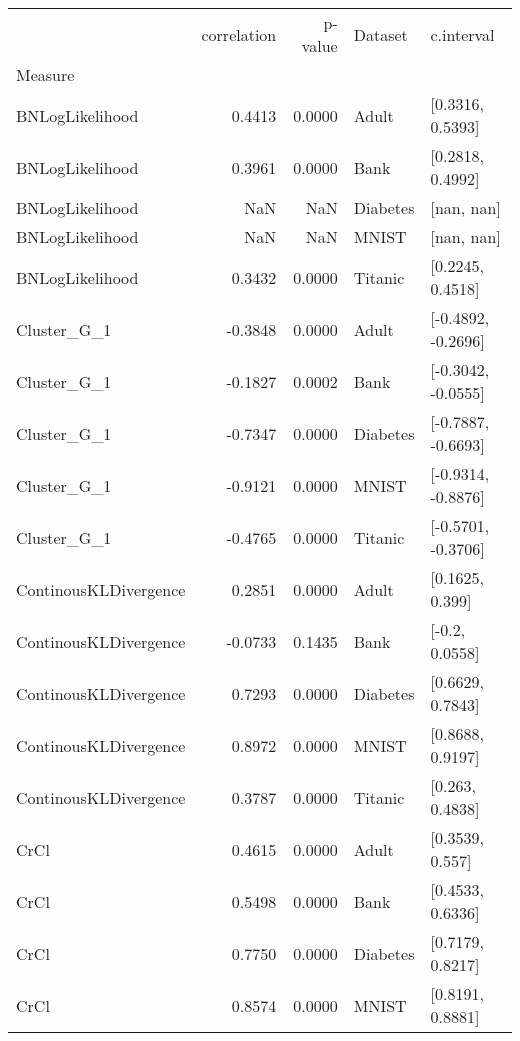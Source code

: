 \begin{tabular}{lrrll}
\toprule
{} &  correlation &  p-value &   Dataset &          c.interval \\
Measure               &              &          &           &                     \\
\midrule
BNLogLikelihood       &       0.4413 &   0.0000 &     Adult &    [0.3316, 0.5393] \\
BNLogLikelihood       &       0.3961 &   0.0000 &      Bank &    [0.2818, 0.4992] \\
BNLogLikelihood       &          NaN &      NaN &  Diabetes &          [nan, nan] \\
BNLogLikelihood       &          NaN &      NaN &     MNIST &          [nan, nan] \\
BNLogLikelihood       &       0.3432 &   0.0000 &   Titanic &    [0.2245, 0.4518] \\
Cluster\_G\_1           &      -0.3848 &   0.0000 &     Adult &  [-0.4892, -0.2696] \\
Cluster\_G\_1           &      -0.1827 &   0.0002 &      Bank &  [-0.3042, -0.0555] \\
Cluster\_G\_1           &      -0.7347 &   0.0000 &  Diabetes &  [-0.7887, -0.6693] \\
Cluster\_G\_1           &      -0.9121 &   0.0000 &     MNIST &  [-0.9314, -0.8876] \\
Cluster\_G\_1           &      -0.4765 &   0.0000 &   Titanic &  [-0.5701, -0.3706] \\
ContinousKLDivergence &       0.2851 &   0.0000 &     Adult &     [0.1625, 0.399] \\
ContinousKLDivergence &      -0.0733 &   0.1435 &      Bank &      [-0.2, 0.0558] \\
ContinousKLDivergence &       0.7293 &   0.0000 &  Diabetes &    [0.6629, 0.7843] \\
ContinousKLDivergence &       0.8972 &   0.0000 &     MNIST &    [0.8688, 0.9197] \\
ContinousKLDivergence &       0.3787 &   0.0000 &   Titanic &     [0.263, 0.4838] \\
CrCl                  &       0.4615 &   0.0000 &     Adult &     [0.3539, 0.557] \\
CrCl                  &       0.5498 &   0.0000 &      Bank &    [0.4533, 0.6336] \\
CrCl                  &       0.7750 &   0.0000 &  Diabetes &    [0.7179, 0.8217] \\
CrCl                  &       0.8574 &   0.0000 &     MNIST &    [0.8191, 0.8881] \\

\end{tabular}
